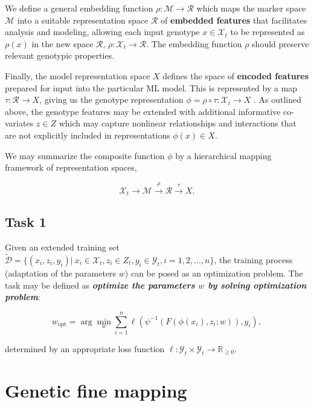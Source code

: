 \documentclass[12pt]{article}
\begin{document}
We define a general embedding function $\rho: \mathcal{M} \rightarrow \mathcal{R}$ which maps the marker space $\mathcal{M}$ into a suitable representation space $\mathcal{R}$ of \textbf{embedded features} that facilitates analysis and modeling, allowing each input genotype $x \in \mathcal{X}_t$ to be represented as $\rho(x)$ in the new space $\mathcal{R}$, $\rho: \mathcal{X}_t \to \mathcal{R}$. The embedding function $\rho$ should preserve relevant genotypic properties.

Finally, the model representation space $X$ defines the space of \textbf{encoded features} prepared for input into the particular ML model. This is represented by a map $\tau: \mathcal{R} \to X$, giving us the genotype representation $\phi= \rho \circ \tau:\mathcal{X}_t \to X$ . As outlined above, the genotype features may be extended with additional informative co-variates $z \in Z$ which may capture nonlinear relationships and interactions that are not explicitly included in representations $\phi(x) \in X$.

We may summarize the composite function $\phi$ by a hierarchical mapping framework of representation spaces,

\[
\mathcal{X}_t \rightarrow \mathcal{M} \xrightarrow{\rho} \mathcal{R} \xrightarrow{\tau}  X.
\]



\subsection{Task 1}\label{sec:task1}

Given an extended training set $\tilde{ \mathcal{D}} = \{ (x_i, z_i, y_i)| \ x_i \in \mathcal{X}_t, z_i \in Z_t, y_i \in \mathcal{Y}_t, i=1,2,...,n\}$, the training process (adaptation of the parameters $w$) can be posed as an optimization problem. The task may be defined as \textbf{\textit{optimize the parameters $w$ by solving optimization problem}}:

\begin{equation}\label{eq:objective}
    w_{\text{opt}} = \arg\min_w \sum_{i=1}^n \ell(\psi^{-1}(F(\phi(x_i),z_i;w)),y_i),
\end{equation}

determined by an appropriate loss function $\ell: \mathcal{Y}_t \times \mathcal{Y}_t \rightarrow \mathbb{R}_{\geq0}$. 

\section{Genetic fine mapping}\label{Sec:fine_mapping}
\end{document}
